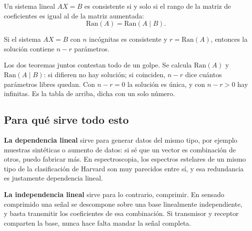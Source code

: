 \documentclass[11pt,letterpaper]{article}
\begin{document}
\begin{teorema}[Consistencia de $AX = B$]
  Un sistema lineal $AX = B$ es consistente si y solo si el rango de
  la matriz de coeficientes es igual al de la matriz aumentada:
  \[
      \mathrm{Ran}(A) = \mathrm{Ran}(A \mid B) .
  \]
\end{teorema}

\begin{teorema}
  Si el sistema $AX = B$ con $n$ incógnitas es consistente y
  $r = \mathrm{Ran}(A)$, entonces la solución contiene $n - r$
  parámetros.
\end{teorema}

\begin{idea}
  Los dos teoremas juntos contestan todo de un golpe. Se calcula
  $\mathrm{Ran}(A)$ y $\mathrm{Ran}(A \mid B)$: si difieren no hay
  solución; si coinciden, $n - r$ dice cuántos parámetros libres
  quedan. Con $n - r = 0$ la solución es única, y con $n - r > 0$ hay
  infinitas. Es la tabla de arriba, dicha con un solo número.
\end{idea}


\subsection*{Para qué sirve todo esto}

\textbf{La dependencia lineal} sirve para generar datos del mismo
tipo, por ejemplo muestras sintéticas o aumento de datos: si sé que un
vector es combinación de otros, puedo fabricar más. En espectroscopia,
los espectros estelares de un mismo tipo de la clasificación de
Harvard son muy parecidos entre sí, y esa redundancia es justamente
dependencia lineal.

\textbf{La independencia lineal} sirve para lo contrario, comprimir.
En sensado comprimido una señal se descompone sobre una base
linealmente independiente, y basta transmitir los coeficientes de esa
combinación. Si transmisor y receptor comparten la base, nunca hace
falta mandar la señal completa.

\newpage


\end{document}
